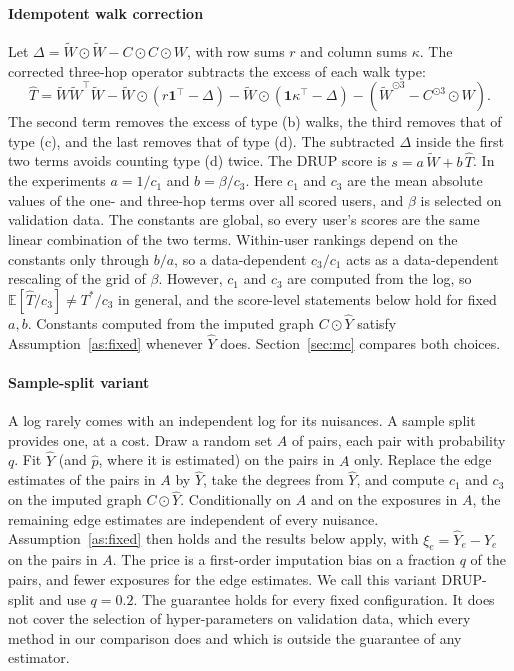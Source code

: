\documentclass[preprint,review,12pt,authoryear]{elsarticle}
\theoremstyle{definition}
\newcommand{\E}{\mathbb{E}}
\newcommand{\tW}{\tilde W}
\begin{document}
\paragraph{Idempotent walk correction}
Let $\Delta=\tW\odot\tW-C\odot C\odot W$, with row sums $r$ and column sums
$\kappa$. The corrected three-hop operator subtracts the excess of each walk
type:
\begin{equation}\label{eq:drup}
\hat T=\tW\tW^\top\tW-\tW\odot(r\mathbf 1^\top-\Delta)-\tW\odot(\mathbf 1\kappa^\top-\Delta)
-(\tW^{\odot3}-C^{\odot3}\odot W).
\end{equation}
The second term removes the excess of type (b) walks, the third removes that of
type (c), and the last removes that of type (d). The subtracted $\Delta$ inside
the first two terms avoids counting type (d) twice. The DRUP score is
$s=a\,\tW+b\,\hat T$.
In the experiments $a=1/c_1$ and $b=\beta/c_3$. Here $c_1$ and $c_3$ are the
mean absolute values of the one- and three-hop terms over all scored users, and
$\beta$ is selected on validation data. The constants are global, so every
user's scores are the same linear combination of the two terms. Within-user
rankings depend on the constants only through $b/a$, so a data-dependent
$c_3/c_1$ acts as a data-dependent rescaling of the grid of $\beta$.
However, $c_1$ and $c_3$ are computed from the log, so
$\E[\hat T/c_3]\neq T^*/c_3$ in general, and the score-level statements below
hold for fixed $a,b$. Constants computed from the imputed graph $C\odot\hat Y$
satisfy Assumption~\ref{as:fixed} whenever $\hat Y$ does. Section~\ref{sec:mc}
compares both choices.

\paragraph{Sample-split variant}
A log rarely comes with an independent log for its nuisances. A sample split
provides one, at a cost. Draw a random set $A$ of pairs, each pair with
probability $q$. Fit $\hat Y$ (and $\hat p$, where it is estimated) on the
pairs in $A$ only. Replace
the edge estimates of the pairs in $A$ by $\hat Y$, take the degrees from
$\hat Y$, and compute $c_1$ and $c_3$ on the imputed graph $C\odot\hat Y$.
Conditionally on $A$ and on the exposures in $A$, the remaining edge estimates
are independent of every nuisance. Assumption~\ref{as:fixed} then holds and the
results below apply, with $\xi_e=\hat Y_e-Y_e$ on the pairs in $A$. The price
is a first-order imputation bias on a fraction $q$ of the pairs, and fewer
exposures for the edge estimates. We call this variant DRUP-split and use
$q=0.2$. The guarantee holds for every fixed configuration. It does not cover
the selection of hyper-parameters on validation data, which every method in our
comparison does and which is outside the guarantee of any estimator.
\end{document}
